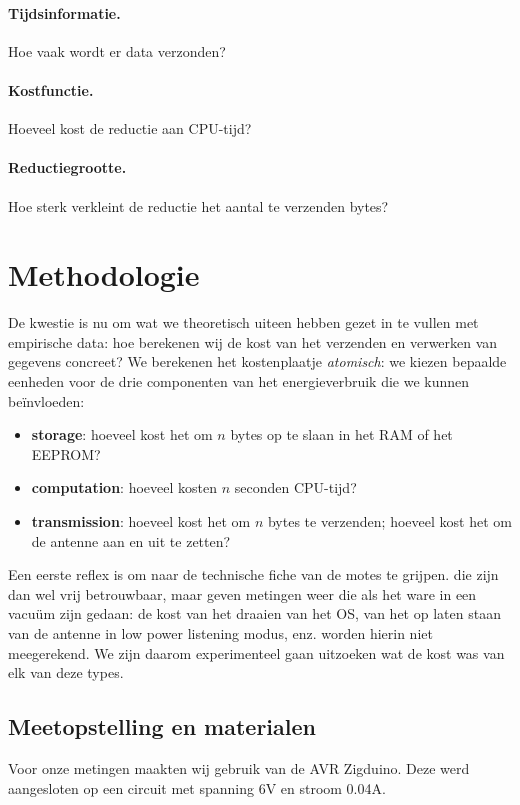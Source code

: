 \documentclass{article}
\begin{document}
\paragraph{Tijdsinformatie.} Hoe vaak wordt er data verzonden?
\paragraph{Kostfunctie.} Hoeveel kost de reductie aan CPU-tijd?
\paragraph{Reductiegrootte.} Hoe sterk verkleint de reductie het aantal te
verzenden bytes?

\section{Methodologie}

De kwestie is nu om wat we theoretisch uiteen hebben gezet in te vullen met
empirische data: hoe berekenen wij de kost van het verzenden en verwerken van
gegevens concreet? We berekenen het kostenplaatje \textit{atomisch}: we kiezen
bepaalde eenheden voor de drie componenten van het energieverbruik die we kunnen
be\"invloeden:

\begin{itemize}
\item \textbf{storage}: hoeveel kost het om $n$ bytes op te slaan in het RAM of
het EEPROM?
\item \textbf{computation}: hoeveel kosten $n$ seconden CPU-tijd?
\item \textbf{transmission}: hoeveel kost het om $n$ bytes te verzenden; hoeveel
kost het om de antenne aan en uit te zetten?
\end{itemize}

Een eerste reflex is om naar de technische fiche van de motes te grijpen. die
zijn dan wel vrij betrouwbaar, maar geven metingen weer die als het ware in een
vacu\"um zijn gedaan: de kost van het draaien van het OS, van het op laten staan
van de antenne in low power listening modus, enz. worden hierin niet
meegerekend. We zijn daarom experimenteel gaan uitzoeken wat de kost was van elk
van deze types.

\subsection{Meetopstelling en materialen}

Voor onze metingen maakten wij gebruik van de AVR Zigduino. Deze werd
aangesloten op een circuit met spanning 6V en stroom 0.04A.
\end{document}
